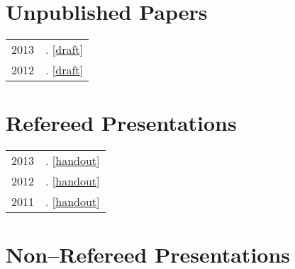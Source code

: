\documentclass[letterpaper]{article}
\makeatletter
\newcommand{\myvrule}{\color{lightgray}\vrule width 1.0pt}
\newenvironment{cvsection}{%
  \vspace{-3ex}
  \renewcommand{\arraystretch}{1.5}
  \begin{longtable}{@{} L R @{}}
}{%
  \end{longtable}
  \vspace{1ex}
  \renewcommand{\arraystretch}{1.0}
}
\makeatother
\begin{document}
\section*{Unpublished Papers}

\begin{cvsection}
  2013 & \hspace{0pt}.
  [\href{http://people.linguistics.mcgill.ca/~brian.buccola/files/buccola-eval2.pdf}{draft}] \\

  2012 & \hspace{0pt}.
  [\href{http://people.linguistics.mcgill.ca/~brian.buccola/files/buccola-eval1.pdf}{draft}]
\end{cvsection}



\section*{Refereed Presentations}

\begin{cvsection}
  2013 & \hspace{0pt}.
  [\href{http://people.linguistics.mcgill.ca/~brian.buccola/files/buccola-mot.pdf}{handout}] \\

  2012 & \hspace{0pt}.
  [\href{http://people.linguistics.mcgill.ca/~brian.buccola/files/buccola-tom5-handout.pdf}{handout}] \\

  2011 & \hspace{0pt}.
  [\href{http://people.linguistics.mcgill.ca/~brian.buccola/files/buccola-tom4-handout.pdf}{handout}]
\end{cvsection}



\section*{Non--Refereed Presentations}
\end{document}

